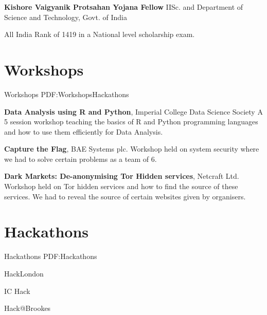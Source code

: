 \documentclass[letterpaper,10pt,oneside]{article}
\begin{document}
\begin{body}
\GapNoBreak


\BulletItem
\textbf{Kishore Vaigyanik Protsahan Yojana Fellow}
\hfill
{}
\newline
IISc. and Department of Science and Technology, Govt. of India
\begin{detail}
\SubItem
All India Rank of 1419 in a National level scholarship exam.
\end{detail}



\section
{Workshops}
{Workshops}
{PDF:WorkshopsHackathons}

\BulletItem
\textbf{Data Analysis using R and Python},
\hfill
{}
\newline
Imperial College Data Science Society
\newline
A 5 session workshop teaching the basics of R and Python programming languages and how to use them efficiently for Data Analysis.
\GapNoBreak

\BulletItem
\textbf{Capture the Flag},
\hfill
{}
\newline
BAE Systems plc.
\newline
Workshop held on system security where we had to solve certain problems as a team of 6.

\GapNoBreak

\BulletItem
\textbf{Dark Markets: De-anonymising Tor Hidden services},
\hfill
{}
\newline
Netcraft Ltd.
\newline
Workshop held on Tor hidden services and how to find the source of these services. We had to reveal the source of certain websites given by organisers.


\section
{Hackathons}
{Hackathons}
{PDF:Hackathons}

\BulletItem
HackLondon
\hfill
{}

\BulletItem
IC Hack
\hfill
{}

\BulletItem
Hack@Brookes
\hfill
{}


\end{body}
\end{document}
